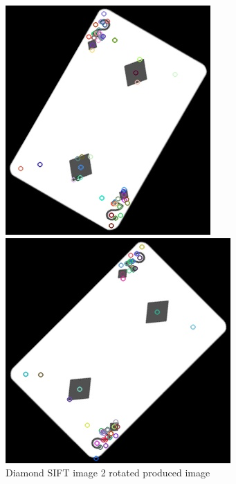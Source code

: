 \documentclass[conference]{IEEEtran}
\begin{document}
\begin{figure}[!htb]
\begin{minipage}[b]{0.2\textwidth}
    \includegraphics[width=\textwidth]{../programme/results/Task_1/rotated_experiements/SIFT/diamond/image_2.jpg}
    \caption{Diamond SIFT image 2 rotated produced image}
    \label{Diamond SIFT image 2 rotated produced image}
  \end{minipage}
  \hfill
    \begin{minipage}[b]{0.2\textwidth}
    \includegraphics[width=\textwidth]{../programme/results/Task_1/rotated_experiements/SIFT/diamond/image_3.jpg}

\end{minipage}
\end{figure}
\end{document}
